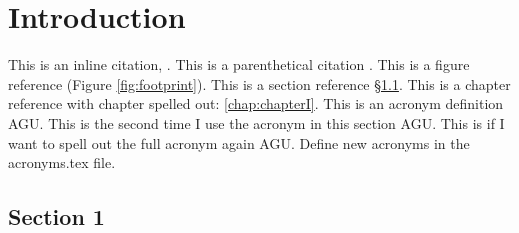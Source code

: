 \chapter{Introduction}
\label{chap:intro}
\acresetall

This is an inline citation, \cite{braden2013}. This is a parenthetical citation \citep{braden2013}. This is a figure reference (Figure \ref{fig:footprint}). This is a section reference \S\ref{sec:intro:section_1}. This is a chapter reference with chapter spelled out: \autoref{chap:chapterI}. This is an acronym definition \ac{AGU}. This is the second time I use the acronym in this section \ac{AGU}. This is if I want to spell out the full acronym again \acf{AGU}. Define new acronyms in the acronyms.tex file.


\section{Section 1}
\label{sec:intro:section_1}
\lipsum[1]
